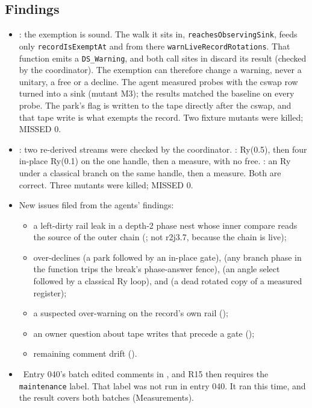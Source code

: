 \subsection*{Findings}
\begin{itemize}
  \item {}: the exemption is sound. The walk it sits in,
  \texttt{reachesObservingSink}, feeds only \texttt{recordIsExemptAt} and from there
  \texttt{warnLiveRecordRotations}. That function emits a \texttt{DS\_Warning}, and both
  call sites in  discard its result (checked by the
  coordinator). The exemption can therefore change a warning, never a unitary, a free or a
  decline. The agent measured probes with the cswap row turned into a sink (mutant M3); the
  results matched the baseline on every probe. The park's flag is written to the tape
  directly after the cswap, and that tape write is what exempts the record. Two fixture
  mutants were killed; MISSED 0.
  \item {}: two re-derived streams were checked by the
  coordinator. : Ry(0.5), then four in-place
  Ry(0.1) on the one handle, then a measure, with no free. :
  an Ry under a classical branch on the same handle, then a measure. Both are correct.
  Three mutants were killed; MISSED 0.
  \item New issues filed from the agents' findings:
  \begin{itemize}
    \item a left-dirty rail leak in a depth-2 phase nest whose inner compare reads the
    source of the outer chain (; not r2j3.7, because the chain
    is live);
    \item over-declines  (a park followed by an in-place
    gate),  (any branch phase in the function trips the break's
    phase-answer fence),  (an angle select followed by a
    classical Ry loop), and  (a dead rotated copy of a
    measured register);
    \item a suspected over-warning on the record's own rail ();
    \item an owner question about tape writes that precede a gate
    ();
    \item remaining comment drift ().
  \end{itemize}
  \item \fpreexisting\ Entry 040's batch edited comments in ,
  and R15 then requires the \texttt{maintenance} label. That label was not run in entry
  040. It ran this time, and the result covers both batches (Measurements).
\end{itemize}

